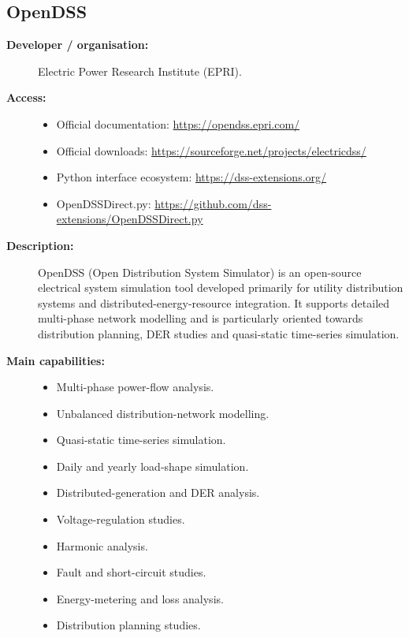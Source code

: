 
\subsection{OpenDSS}

\begin{description}

    \item[\textbf{Developer / organisation:}]
    Electric Power Research Institute (EPRI).

    \item[\textbf{Access:}] \hfill
    \begin{itemize}
        \item Official documentation:
        \url{https://opendss.epri.com/}

        \item Official downloads:
        \url{https://sourceforge.net/projects/electricdss/}

        \item Python interface ecosystem:
        \url{https://dss-extensions.org/}

        \item OpenDSSDirect.py:
        \url{https://github.com/dss-extensions/OpenDSSDirect.py}
    \end{itemize}

    \item[\textbf{Description:}]
    OpenDSS (Open Distribution System Simulator) is an open-source electrical
    system simulation tool developed primarily for utility distribution
    systems and distributed-energy-resource integration. It supports detailed
    multi-phase network modelling and is particularly oriented towards
    distribution planning, DER studies and quasi-static time-series
    simulation.

    \item[\textbf{Main capabilities:}] \hfill
    \begin{itemize}
        \item Multi-phase power-flow analysis.
        \item Unbalanced distribution-network modelling.
        \item Quasi-static time-series simulation.
        \item Daily and yearly load-shape simulation.
        \item Distributed-generation and DER analysis.
        \item Voltage-regulation studies.
        \item Harmonic analysis.
        \item Fault and short-circuit studies.
        \item Energy-metering and loss analysis.
        \item Distribution planning studies.
    \end{itemize}


\end{description}
